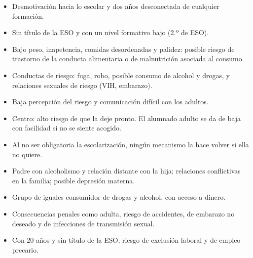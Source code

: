\documentclass[11pt,a4paper]{article}
\newcommand{\dafobox}[3]{%
  \begin{tcolorbox}[enhanced, colback=#1!5, colframe=#1, boxrule=0.8pt, arc=1pt,
      title=#2, fonttitle=\bfseries, height=9.6cm, valign=top, fontupper=\small]
    #3
  \end{tcolorbox}}
\begin{document}
\noindent
\begin{minipage}[t]{0.49\linewidth}
\dafobox{acento}{Debilidades (internas)}{%
\begin{itemize}[leftmargin=1em, itemsep=1pt]
  \item Desmotivación hacia lo escolar y dos años desconectada de cualquier
  formación.
  \item Sin título de la ESO y con un nivel formativo bajo (2.º de ESO).
  \item Bajo peso, inapetencia, comidas desordenadas y palidez: posible riesgo de
  trastorno de la conducta alimentaria o de malnutrición asociada al consumo.
  \item Conductas de riesgo: fuga, robo, posible consumo de alcohol y drogas, y
  relaciones sexuales de riesgo (VIH, embarazo).
  \item Baja percepción del riesgo y comunicación difícil con los adultos.
  \item Centro: alto riesgo de que la deje pronto. El alumnado adulto se da de
  baja con facilidad si no se siente acogido.
\end{itemize}}
\end{minipage}\hfill
\begin{minipage}[t]{0.49\linewidth}
\dafobox{naranja}{Amenazas (externas)}{%
\begin{itemize}[leftmargin=1em, itemsep=1pt]
  \item Al no ser obligatoria la escolarización, ningún mecanismo la hace
  volver si ella no quiere.
  \item Padre con alcoholismo y relación distante con la hija; relaciones
  conflictivas en la familia; posible depresión materna.
  \item Grupo de iguales consumidor de drogas y alcohol, con acceso a dinero.
  \item Consecuencias penales como adulta, riesgo de accidentes, de embarazo no
  deseado y de infecciones de transmisión sexual.
  \item Con 20 años y sin título de la ESO, riesgo de exclusión laboral y de
  empleo precario.
\end{itemize}}
\end{minipage}
\end{document}
